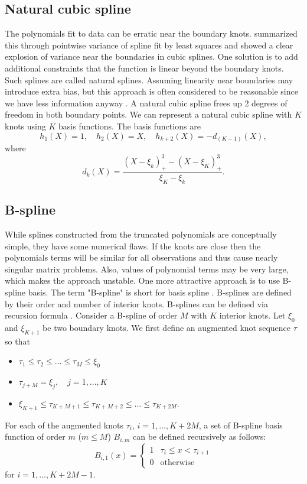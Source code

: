 \documentclass{article}
\begin{document}
\subsection{Natural cubic spline}
The polynomials fit to data can be erratic near the boundary knots. \cite{friedman2001elements} summarized this through pointwise variance of spline fit by least squares and showed a clear explosion of variance near the boundaries in cubic splines. One solution is to add additional constraints that the function is linear beyond the boundary knots. Such splines are called natural splines. Assuming linearity near boundaries may introduce extra bias, but this approach is often considered to be reasonable since we have less information anyway \cite{friedman2001elements}. A natural cubic spline frees up 2 degrees of freedom in both boundary points. We can represent a natural cubic spline with $K$ knots using $K$ basis functions. The basis functions are
\begin{equation}
h_1(X)=1,\quad h_2(X)=X,\quad h_{k+2}(X)=-d_{(K-1)}(X),
\end{equation}
where 
\begin{equation}
d_k(X) = \frac{(X-\xi_k)^3_+ - (X-\xi_K)^3_+ }{\xi_K - \xi_k}.
\end{equation}

\subsection{B-spline} 
While splines constructed from the truncated polynomials are conceptually simple, they have some numerical flaws. If the knots are close then the polynomials terms will be similar for all observations and thus cause nearly singular matrix problems. Also, values of polynomial terms may be very large, which makes the approach unstable. One more attractive approach is to use B-spline basis. The term "B-spline" is short for basis spline \cite{de1978practical}.  B-splines are defined by their order and number of interior knots. B-splines can be defined via recursion formula \cite{de1986b}. Consider a B-spline of order $M$ with $K$ interior knots. Let $\xi_0$ and $\xi_{K+1}$ be two boundary knots. We first define an augmented knot sequence \cite{friedman2001elements} $\tau$ so that 
\begin{itemize}
	\item $\tau_1 \le  \tau_2 \le ...\le\tau_M \le \xi_0$
	\item $\tau_{j+M} = \xi_j, \quad j=1,...,K$
	\item $\xi_{K+1} \le \tau_{K+M+1} \le \tau_{K+M+2} \le ... \le\tau_{K+2M}.$
\end{itemize}
For each of the augmented knots $\tau_i$, $i=1,...,K+2M$, a set of B-spline basis function of order $m$ ($m \le M $) $B_{i,m}$ can be defined recursively as follows: \cite{friedman2001elements}
\begin{equation}
B_{i,1}(x) = 
\begin{cases}
1& \tau_i \le x < \tau_{i+1}\\
0& \text{otherwise}
\end{cases}
\end{equation}
for $i=1,...,K+2M-1$.
\end{document}
